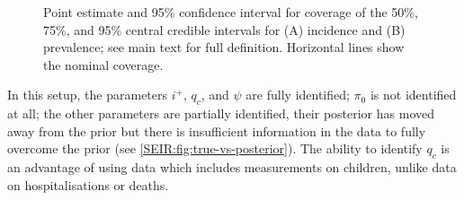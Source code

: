 \documentclass[thesis.tex]{subfiles}
\begin{document}
\begin{figure}
    \vspace{-3cm}
    \caption[Coverage of simulation study (derived quantities)]{%
        Point estimate and 95\% confidence interval for coverage of the 50\%, 75\%, and 95\% central credible intervals for (A) incidence and (B) prevalence; see main text for full definition.
        Horizontal lines show the nominal coverage.
    }
    \label{SEIR:fig:sim-inc-prev}
\end{figure}


In this setup, the parameters $i^+$, $q_c$, and $\psi$ are fully identified; $\pi_0$ is not identified at all; the other parameters are partially identified, their posterior has moved away from the prior but there is insufficient information in the data to fully overcome the prior (see \cref{SEIR:fig:true-vs-posterior}).
The ability to identify $q_c$ is an advantage of using data which includes measurements on children, unlike data on hospitalisations or deaths.
\end{document}
